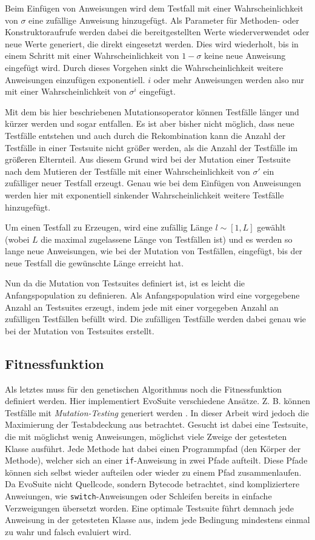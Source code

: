 \documentclass[a4paper,11pt]{article}
\begin{document}
Beim Einfügen von Anweisungen wird dem Testfall mit einer Wahrscheinlichkeit von $\sigma$ eine zufällige Anweisung hinzugefügt.
Als Parameter für Methoden- oder Konstruktoraufrufe werden dabei die bereitgestellten Werte wiederverwendet oder neue Werte generiert, die direkt eingesetzt werden.
Dies wird wiederholt, bis in einem Schritt mit einer Wahrscheinlichkeit von $1 - \sigma$ keine neue Anweisung eingefügt wird.
Durch dieses Vorgehen sinkt die Wahrscheinlichkeit weitere Anweisungen einzufügen exponentiell.
$i$ oder mehr Anweisungen werden also nur mit einer Wahrscheinlichkeit von $\sigma^i$ eingefügt.

Mit dem bis hier beschriebenen Mutationsoperator können Testfälle länger und kürzer werden und sogar entfallen.
Es ist aber bisher nicht möglich, dass neue Testfälle entstehen und auch durch die Rekombination kann die Anzahl der Testfälle in einer Testsuite nicht größer werden, als die Anzahl der Testfälle im größeren Elternteil.
Aus diesem Grund wird bei der Mutation einer Testsuite nach dem Mutieren der Testfälle mit einer Wahrscheinlichkeit von $\sigma'$ ein zufälliger neuer Testfall erzeugt.
Genau wie bei dem Einfügen von Anweisungen werden hier mit exponentiell sinkender Wahrscheinlichkeit weitere Testfälle hinzugefügt.

Um einen Testfall zu Erzeugen, wird eine zufällig Länge $l \sim [1, L]$ gewählt (wobei $L$ die maximal zugelassene Länge von Testfällen ist) und es werden so lange neue Anweisungen, wie bei der Mutation von Testfällen, eingefügt, bis der neue Testfall die gewünschte Länge erreicht hat.

Nun da die Mutation von Testsuites definiert ist, ist es leicht die Anfangspopulation zu definieren.
Als Anfangspopulation wird eine vorgegebene Anzahl an Testsuites erzeugt, indem jede mit einer vorgegeben Anzahl an zufälligen Testfällen befüllt wird.
Die zufälligen Testfälle werden dabei genau wie bei der Mutation von Testsuites erstellt.

\subsection{Fitnessfunktion}

Als letztes muss für den genetischen Algorithmus noch die Fitnessfunktion definiert werden.
Hier implementiert EvoSuite verschiedene Ansätze.
Z. B. können Testfälle mit \textit{Mutation-Testing} generiert werden \cite{emse14_mutation}.
In dieser Arbeit wird jedoch die Maximierung der Testabdeckung aus \cite{TSE12_EvoSuite} betrachtet.
Gesucht ist dabei eine Testsuite, die mit möglichst wenig Anweisungen, möglichst viele Zweige der getesteten Klasse ausführt.
Jede Methode hat dabei einen Programmpfad (den Körper der Methode), welcher sich an einer \lstinline{if}-Anweisung in zwei Pfade aufteilt.
Diese Pfade können sich selbst wieder aufteilen oder wieder zu einem Pfad zusammenlaufen.
Da EvoSuite nicht Quellcode, sondern Bytecode betrachtet, sind kompliziertere Anweiungen, wie \lstinline{switch}-Anweisungen oder Schleifen bereits in einfache Verzweigungen übersetzt worden.
Eine optimale Testsuite führt demnach jede Anweisung in der getesteten Klasse aus, indem jede Bedingung mindestens einmal zu wahr und falsch evaluiert wird.
\end{document}
